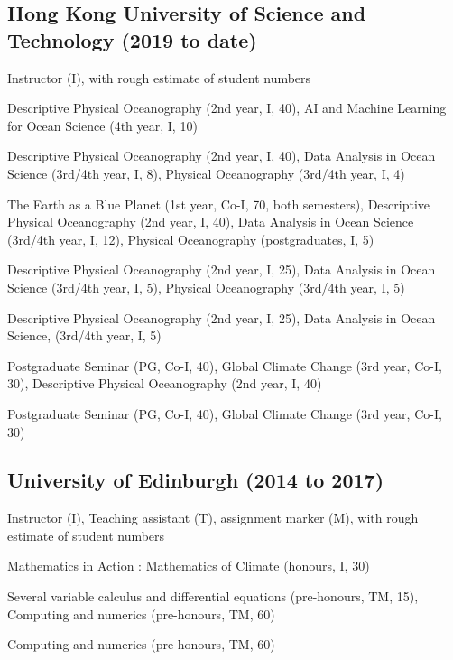 \documentclass[letterpaper]{article}
\renewenvironment{itemize}{
  \begin{list}{}{
    \setlength{\leftmargin}{1.5em}
  }
}{
  \end{list}
}
\begin{document}
\subsection*{Hong Kong University of Science and Technology (2019 to date)}
\begin{itemize}
\item Instructor (I), with rough estimate of student numbers
\begin{itemize}
  \item[25/26:] Descriptive Physical Oceanography (2nd year, I, 40), AI and Machine Learning for Ocean Science (4th year, I, 10)
  \item[24/25:] Descriptive Physical Oceanography (2nd year, I, 40), Data Analysis in Ocean Science (3rd/4th year, I, 8), Physical Oceanography (3rd/4th year, I, 4)
  \item[23/24:] The Earth as a Blue Planet (1st year, Co-I, 70, both semesters), Descriptive Physical Oceanography (2nd year, I, 40), Data Analysis in Ocean Science (3rd/4th year, I, 12), Physical Oceanography (postgraduates, I, 5)
  \item[22/23:] Descriptive Physical Oceanography (2nd year, I, 25), Data Analysis in Ocean Science (3rd/4th year, I, 5), Physical Oceanography (3rd/4th year, I, 5)
  \item[21/22:] Descriptive Physical Oceanography (2nd year, I, 25), Data Analysis in Ocean Science, (3rd/4th year, I, 5)
  \item[20/21:] Postgraduate Seminar (PG, Co-I, 40), Global Climate Change (3rd year, Co-I, 30), Descriptive Physical Oceanography (2nd year, I, 40)
  \item[19/20:] Postgraduate Seminar (PG, Co-I, 40), Global Climate Change (3rd year, Co-I, 30)
\end{itemize}
\end{itemize}

\subsection*{University of Edinburgh (2014 to 2017)}
\begin{itemize}
\item Instructor (I), Teaching assistant (T), assignment marker (M), with rough estimate of
student numbers
\begin{itemize}
  \item[16/17:] Mathematics in Action : Mathematics of Climate (honours, I, 30)
	\item[15/16:] Several variable calculus and differential equations
	(pre-honours, TM, 15), Computing and numerics (pre-honours, TM, 60)
	\item[14/15:] Computing and numerics (pre-honours, TM, 60)
\end{itemize}
\end{itemize}
\end{document}
